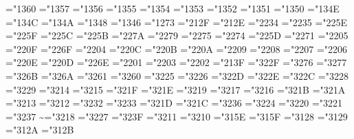 \mathchardef\coprod="1360
\mathchardef\bigvee="1357
\mathchardef\bigwedge="1356
\mathchardef\biguplus="1355
\mathchardef\bigcap="1354
\mathchardef\bigcup="1353
\mathchardef\intop="1352 \def\int{\intop\nolimits}
\mathchardef\prod="1351
\mathchardef\sum="1350
\mathchardef\bigotimes="134E
\mathchardef\bigoplus="134C
\mathchardef\bigodot="134A
\mathchardef\ointop="1348 \def\oint{\ointop\nolimits}
\mathchardef\bigsqcup="1346
\mathchardef\smallint="1273
\mathchardef\triangleleft="212F
\mathchardef\triangleright="212E
\mathchardef\bigtriangleup="2234
\mathchardef\bigtriangledown="2235
\mathchardef\wedge="225E \let\land=\wedge
\mathchardef\vee="225F \let\lor=\vee
\mathchardef\cap="225C
\mathchardef\cup="225B
\mathchardef\ddagger="227A
\mathchardef\dagger="2279
\mathchardef\sqcap="2275
\mathchardef\sqcup="2274
\mathchardef\uplus="225D
\mathchardef\amalg="2271
\mathchardef\diamond="2205
\mathchardef\bullet="220F
\mathchardef\wr="226F
\mathchardef\div="2204
\mathchardef\odot="220C
\mathchardef\oslash="220B
\mathchardef\otimes="220A
\mathchardef\ominus="2209
\mathchardef\oplus="2208
\mathchardef\mp="2207
\mathchardef\pm="2206
\mathchardef\circ="220E
\mathchardef\bigcirc="220D
\mathchardef\setminus="226E %
\mathchardef\cdot="2201
\mathchardef\ast="2203
\mathchardef\times="2202
\mathchardef\star="213F
\mathchardef\propto="322F
\mathchardef\sqsubseteq="3276
\mathchardef\sqsupseteq="3277
\mathchardef\parallel="326B
\mathchardef\mid="326A
\mathchardef\dashv="3261
\mathchardef\vdash="3260
\mathchardef\nearrow="3225
\mathchardef\searrow="3226
\mathchardef\nwarrow="322D
\mathchardef\swarrow="322E
\mathchardef\Leftrightarrow="322C
\mathchardef\Leftarrow="3228
\mathchardef\Rightarrow="3229
\def\neq{\not=} \let\ne=\neq
\mathchardef\leq="3214 \let\le=\leq
\mathchardef\geq="3215 \let\ge=\geq
\mathchardef\succ="321F
\mathchardef\prec="321E
\mathchardef\approx="3219
\mathchardef\succeq="3217
\mathchardef\preceq="3216
\mathchardef\supset="321B
\mathchardef\subset="321A
\mathchardef\supseteq="3213
\mathchardef\subseteq="3212
\mathchardef\in="3232
\mathchardef\ni="3233 \let\owns=\ni
\mathchardef\gg="321D
\mathchardef\ll="321C
\mathchardef\not="3236
\mathchardef\leftrightarrow="3224
\mathchardef\leftarrow="3220 \let\gets=\leftarrow
\mathchardef\rightarrow="3221 \let\to=\rightarrow
\mathchardef\mapstochar="3237 \def\mapsto{\mapstochar\rightarrow}
\mathchardef\sim="3218
\mathchardef\simeq="3227
\mathchardef\perp="323F
\mathchardef\equiv="3211
\mathchardef\asymp="3210
\mathchardef\smile="315E
\mathchardef\frown="315F
\mathchardef\leftharpoonup="3128
\mathchardef\leftharpoondown="3129
\mathchardef\rightharpoonup="312A
\mathchardef\rightharpoondown="312B

